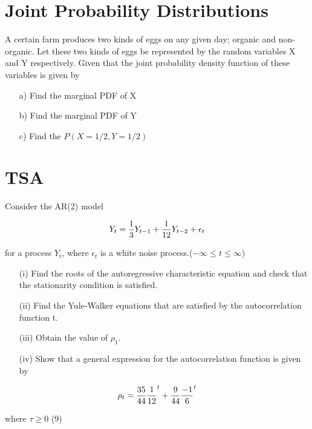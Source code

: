 \newpage

\section{Joint Probability Distributions}	
A certain farm produces two kinds of eggs on any given day; organic and non-organic. 
Let these two kinds of eggs be represented by the random variables X and Y respectively. 
Given that the joint probability density function of these variables is given by


\begin{itemize}
	\item[a)] Find the marginal PDF of X
	
	\item[b)] Find the marginal PDF of Y
	
	\item[c)] Find the $P(X = 1/2, Y = 1/2)$
\end{itemize}


%	
%		
\section{TSA}
Consider the AR(2) model


\[Y_t={1\over 3}Y_{t-1}+{1\over 12}Y_{t-2}+ \epsilon_t\]

for a process $Y_t$, where {$\epsilon_t$} is a white noise process.($-\infty \leq t \leq \infty$)

\begin{itemize}
	\item[(i)] Find the roots of the autoregressive characteristic equation and check that the stationarity condition is satisfied.
	
	\item[(ii)] Find the Yule-Walker equations that are satisfied by the autocorrelation function t.
	
	\item[(iii)] Obtain the value of $\rho_1$.
	
	\item[(iv)] Show that a general expression for the autocorrelation function is given by
\end{itemize}
\[\rho_t={35\over 44}{1\over 12}^t +{9\over 44}{-1\over 6}^t
\]

where $\tau \geq 0$     (9)



